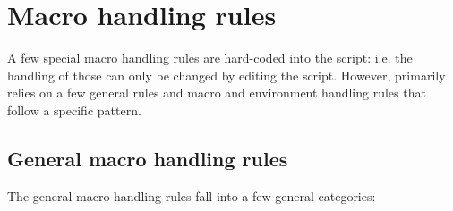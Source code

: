\documentclass{article}
\begin{document}

\section{Macro handling rules}

A few special macro handling rules are hard-coded into the \TeXcount{} script: i.e. the handling of those can only be changed by editing the script. However, \TeXcount{} primarily relies on a few general rules and macro and environment handling rules that follow a specific pattern.


\subsection{General macro handling rules}

The general macro handling rules fall into a few general categories:
\end{document}
